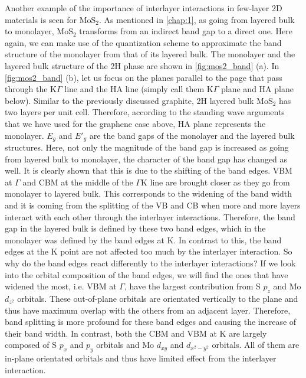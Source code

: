 Another example of the importance of interlayer interactions in few-layer 2D materials is seen for MoS$_2$. As mentioned in \autoref{chap:1}, as going from layered bulk to monolayer, MoS$_2$ transforms from an indirect band gap to a direct one. Here again, we can make use of the quantization scheme to approximate the band structure of the monolayer from that of its layered bulk. The monolayer and the layered bulk structure of the 2H phase are shown in \autoref{fig:mos2_band} (a). In \autoref{fig:mos2_band} (b), let us focus on the planes parallel to the page that pass through the $\mathrm{K}\Gamma$ line and the HA line (simply call them $\mathrm{K}\Gamma$ plane and HA plane below). Similar to the previously discussed graphite, 2H layered bulk MoS$_2$ has two layers per unit cell. Therefore, according to the standing wave arguments that we have used for the graphene case above, HA plane represents the monolayer. $E_g$ and $E\prime_g$ are the band gaps of the monolayer and the layered bulk structures. Here, not only the magnitude of the band gap is increased as going from layered bulk to monolayer, the character of the band gap has changed as well. It is clearly shown that this is due to the shifting of the band edges. VBM at $\Gamma$ and CBM at the middle of the $\Gamma\mathrm{K}$ line are brought closer as they go from monolayer to layered bulk. This corresponds to the widening of the band width and it is coming from the splitting of the VB and CB when more and more layers interact with each other through the interlayer interactions. Therefore, the band gap in the layered bulk is defined by these two band edges, which in the monolayer was defined by the band edges at $\mathrm{K}$. In contrast to this, the band edges at the $\mathrm{K}$ point are not affected too much by the interlayer interaction. So why do the band edges react differently to the interlayer interactions? If we look into the orbital composition of the band edges, we will find the ones that have widened the most, i.e. VBM at $\Gamma$, have the largest contribution from S $p_z$ and Mo $d_{z^2}$ orbitals. These out-of-plane orbitals are orientated vertically to the plane and thus have maximum overlap with the others from an adjacent layer. Therefore, band splitting is more profound for these band edges and causing the increase of their band width. In contrast, both the CBM and VBM at $\mathrm{K}$ are largely composed of S $p_x$ and $p_y$ orbitals and Mo $d_{xy}$ and $d_{x^2-y^2}$ orbitals. All of them are in-plane orientated orbitals and thus have limited effect from the interlayer interaction\cite{Padilha2014}.

